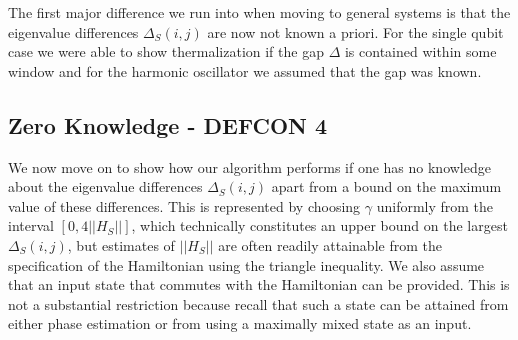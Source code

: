 \documentclass{article}
\newcommand{\norm}[1]{\left|\left| #1 \right|\right|}
\begin{document}
The first major difference we run into when moving to general systems is that the eigenvalue differences $\Delta_S(i,j)$ are now not known a priori. For the single qubit case we were able to show thermalization if the gap $\Delta$ is contained within some window and for the harmonic oscillator we assumed that the gap was known. 

\subsection{Zero Knowledge - DEFCON 4} \label{sec:zero_knowledge}
We now move on to show how our algorithm performs if one has no knowledge about the eigenvalue differences $\Delta_S(i,j)$ apart from a bound on the maximum value of these differences. This is represented by choosing $\gamma$ uniformly from the interval $[0, 4 \norm{H_S}]$, which technically constitutes an upper bound on the largest $\Delta_S(i,j)$, but estimates of $\norm{H_S}$ are often readily attainable from the specification of the Hamiltonian using the triangle inequality.  We also assume that an input state that commutes with the Hamiltonian can be provided.  This is not a substantial restriction because recall that such a state can be attained from either phase estimation or from using a maximally mixed state as an input.
\end{document}
